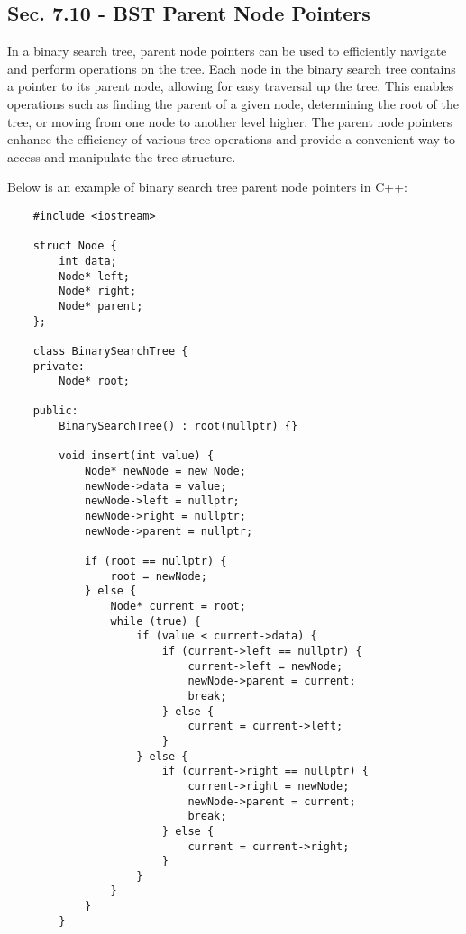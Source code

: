 \subsection*{Sec. 7.10 - BST Parent Node Pointers}

In a binary search tree, parent node pointers can be used to efficiently navigate and perform operations on the tree. Each node in the binary search tree contains a pointer to its parent node, allowing for easy traversal up the tree. This enables operations such as finding the parent of a given node, determining the root of the tree, 
or moving from one node to another level higher. The parent node pointers enhance the efficiency of various tree operations and provide a convenient way to access and manipulate the tree structure.

\begin{solution}
    Below is an example of binary search tree parent node pointers in C++:

    \horizontalline

    \begin{verbatim}
    #include <iostream>

    struct Node {
        int data;
        Node* left;
        Node* right;
        Node* parent;
    };
    
    class BinarySearchTree {
    private:
        Node* root;
    
    public:
        BinarySearchTree() : root(nullptr) {}
    
        void insert(int value) {
            Node* newNode = new Node;
            newNode->data = value;
            newNode->left = nullptr;
            newNode->right = nullptr;
            newNode->parent = nullptr;
    
            if (root == nullptr) {
                root = newNode;
            } else {
                Node* current = root;
                while (true) {
                    if (value < current->data) {
                        if (current->left == nullptr) {
                            current->left = newNode;
                            newNode->parent = current;
                            break;
                        } else {
                            current = current->left;
                        }
                    } else {
                        if (current->right == nullptr) {
                            current->right = newNode;
                            newNode->parent = current;
                            break;
                        } else {
                            current = current->right;
                        }
                    }
                }
            }
        }
    

\end{verbatim}
\end{solution}

